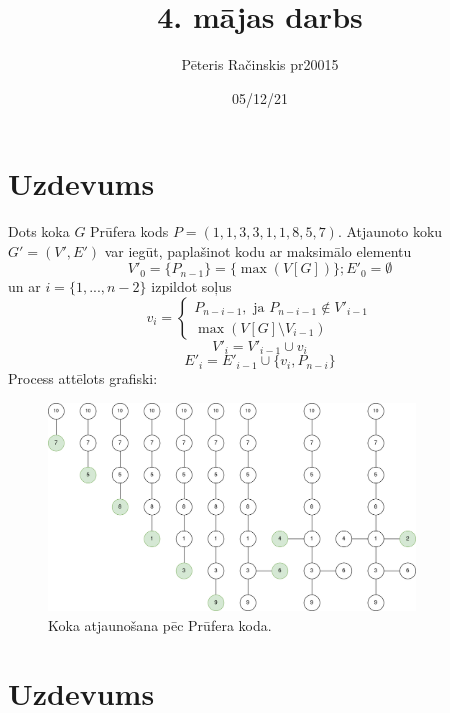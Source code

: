 \documentclass[12pt, a4paper]{article}
\author{Pēteris Račinskis pr20015}
\date{05/12/21}
\begin{document}
\title{4. mājas darbs}

\maketitle

\section{Uzdevums}

Dots koka $G$ Prūfera kods $P=(1,1,3,3,1,1,8,5,7)$. Atjaunoto koku $G' = (V',E')$ var iegūt, paplašinot kodu ar maksimālo elementu
\begin{equation}
    V'_0 = \lbrace P_{n-1} \rbrace = \lbrace \max(V[G]) \rbrace; E'_0=\emptyset
\end{equation}
un ar $i=\lbrace 1, ..., n-2 \rbrace$ izpildot soļus
\begin{equation}
    v_i = 
\begin{cases}
    P_{n-i-1}, \text{ ja } P_{n-i-1} \notin V'_{i-1} \\
    \max(V[G] \setminus V_{i-1})
\end{cases}
\end{equation}
\begin{equation}
    V'_i = V'_{i-1} \cup v_i
\end{equation}
\begin{equation}
    E'_i = E'_{i-1} \cup \lbrace v_i, P_{n-i} \rbrace
\end{equation}
Process attēlots grafiski:

\begin{figure}[h!]
    \centering
    \includegraphics[height=5.5cm,page=1]{pruefer.png}
    \caption{Koka atjaunošana pēc Prūfera koda.}
\end{figure}

\newpage
\section{Uzdevums}
\end{document}
